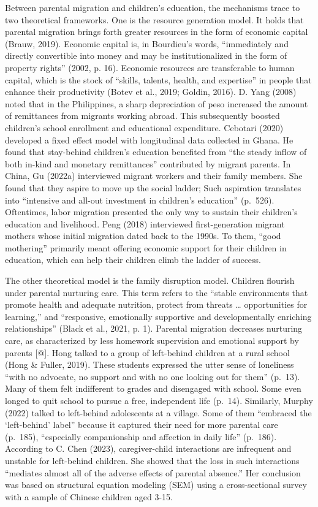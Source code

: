 \documentclass[
  man,floatsintext]{apa7}
\begin{document}
Between parental migration and children's education, the mechanisms trace to two theoretical frameworks. One is the resource generation model. It holds that parental migration brings forth greater resources in the form of economic capital (Brauw, 2019). Economic capital is, in Bourdieu's words, ``immediately and directly convertible into money and may be institutionalized in the form of property rights'' (2002, p. 16). Economic resources are transferable to human capital, which is the stock of ``skills, talents, health, and expertise'' in people that enhance their productivity (Botev et al., 2019; Goldin, 2016). D. Yang (2008) noted that in the Philippines, a sharp depreciation of peso increased the amount of remittances from migrants working abroad. This subsequently boosted children's school enrollment and educational expenditure. Cebotari (2020) developed a fixed effect model with longitudinal data collected in Ghana. He found that stay-behind children's education benefited from ``the steady inflow of both in-kind and monetary remittances'' contributed by migrant parents. In China, Gu (2022a) interviewed migrant workers and their family members. She found that they aspire to move up the social ladder; Such aspiration translates into ``intensive and all-out investment in children's education'' (p.~526). Oftentimes, labor migration presented the only way to sustain their children's education and livelihood. Peng (2018) interviewed first-generation migrant mothers whose initial migration dated back to the 1990s. To them, ``good mothering'' primarily meant offering economic support for their children in education, which can help their children climb the ladder of success.

The other theoretical model is the family disruption model. Children flourish under parental nurturing care. This term refers to the ``stable environments that promote health and adequate nutrition, protect from threats \ldots{} opportunities for learning,'' and ``responsive, emotionally supportive and developmentally enriching relationships'' (Black et al., 2021, p. 1). Parental migration decreases nurturing care, as characterized by less homework supervision and emotional support by parents {[}@{]}. Hong talked to a group of left-behind children at a rural school (Hong \& Fuller, 2019). These students expressed the utter sense of loneliness ``with no advocate, no support and with no one looking out for them'' (p.~13). Many of them felt indifferent to grades and disengaged with school. Some even longed to quit school to pursue a free, independent life (p.~14). Similarly, Murphy (2022) talked to left-behind adolescents at a village. Some of them ``embraced the `left-behind' label'' because it captured their need for more parental care (p.~185), ``especially companionship and affection in daily life'' (p.~186). According to C. Chen (2023), caregiver-child interactions are infrequent and unstable for left-behind children. She showed that the loss in such interactions ``mediates almost all of the adverse effects of parental absence.'' Her conclusion was based on structural equation modeling (SEM) using a cross-sectional survey with a sample of Chinese children aged 3-15.
\end{document}
